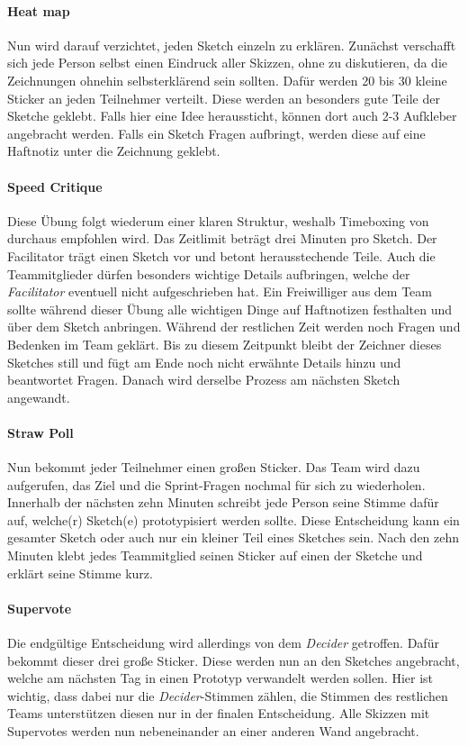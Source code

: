 \paragraph{Heat map}
\label{sec:Sprint-Tag3-Heatmap}
Nun wird darauf verzichtet, jeden Sketch einzeln zu erklären. Zunächst verschafft sich jede Person selbst einen Eindruck aller Skizzen, ohne zu diskutieren, da die Zeichnungen ohnehin selbsterklärend sein sollten. Dafür werden 20 bis 30 kleine Sticker an jeden Teilnehmer verteilt. Diese werden an besonders gute Teile der Sketche geklebt. Falls hier eine Idee heraussticht, können dort auch 2-3 Aufkleber angebracht werden. Falls ein Sketch Fragen aufbringt, werden diese auf eine Haftnotiz unter die Zeichnung geklebt.

\paragraph{Speed Critique}
\label{sec:Sprint-Tag3-SpeedCritique}
Diese Übung folgt wiederum einer klaren Struktur, weshalb Timeboxing von \citeauthor{Sprint} durchaus empfohlen wird. Das Zeitlimit beträgt drei Minuten pro Sketch. Der Facilitator trägt einen Sketch vor und betont herausstechende Teile. Auch die Teammitglieder dürfen besonders wichtige Details aufbringen, welche der \textit{Facilitator} eventuell nicht aufgeschrieben hat. Ein Freiwilliger aus dem Team sollte während dieser Übung alle wichtigen Dinge auf Haftnotizen festhalten und über dem Sketch anbringen. Während der restlichen Zeit werden noch Fragen und Bedenken im Team geklärt. Bis zu diesem Zeitpunkt bleibt der Zeichner dieses Sketches still und fügt am Ende noch nicht erwähnte Details hinzu und beantwortet Fragen. Danach wird derselbe Prozess am nächsten Sketch angewandt.

\paragraph{Straw Poll}
\label{sec:Sprint-Tag3-StrawPoll}
Nun bekommt jeder Teilnehmer einen großen Sticker. Das Team wird dazu aufgerufen, das Ziel und die Sprint-Fragen nochmal für sich zu wiederholen. Innerhalb der nächsten zehn Minuten schreibt jede Person seine Stimme dafür auf, welche(r) Sketch(e) prototypisiert werden sollte. Diese Entscheidung kann ein gesamter Sketch oder auch nur ein kleiner Teil eines Sketches sein. Nach den zehn Minuten klebt jedes Teammitglied seinen Sticker auf einen der Sketche und erklärt seine Stimme kurz.

\paragraph{Supervote}
\label{sec:Sprint-Tag3-Supervote}
Die endgültige Entscheidung wird allerdings von dem \textit{Decider} getroffen. Dafür bekommt dieser drei große Sticker. Diese werden nun an den Sketches angebracht, welche am nächsten Tag in einen Prototyp verwandelt werden sollen. Hier ist wichtig, dass dabei nur die \textit{Decider}-Stimmen zählen, die Stimmen des restlichen Teams unterstützen diesen nur in der finalen Entscheidung. Alle Skizzen mit Supervotes werden nun nebeneinander an einer anderen Wand angebracht.

